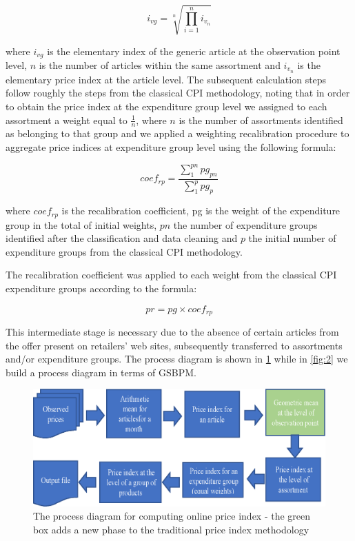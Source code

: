 \documentclass[]{article}
\begin{document}
\begin{equation}\label{eq:1}
i_{vg} = \sqrt[n]{\prod_{i=1}^{n} i_{v_{n}}}
\end{equation}


where $i_{vg}$ is the elementary index of the generic article at the observation point level, $n$ is the number of 
articles within the same assortment and $i_{v_{n}}$ is the elementary price index at the article level. 
The subsequent calculation steps follow roughly the steps from the classical CPI methodology, noting that in order 
to obtain the price index at the expenditure group level we assigned to each assortment a weight equal to $\frac{1}{n}$,
where $n$ is the number of assortments identified as belonging to that group and we applied a weighting 
recalibration procedure to aggregate price indices at expenditure group level using the following formula:


\begin{equation}\label{eq:2}
coef_{rp} = \frac{\sum_1^{pn}{pg_{pn}}}{\sum_1^p{pg_{p}}}
\end{equation}


where $coef_{rp}$  is the recalibration coefficient, pg is the weight of the expenditure group in the total of 
initial weights, $pn$ the number of expenditure groups identified after the classification and data cleaning 
and $p$ the initial number of expenditure groups from the classical CPI methodology.


The recalibration coefficient was applied to each weight from the classical CPI expenditure groups according to the formula:


\begin{equation}\label{eq:3}
pr = pg \times coef_{rp}
\end{equation}


This intermediate stage is necessary due to the absence of certain articles from the offer present on retailers' web sites, subsequently transferred to assortments and/or expenditure groups.
The process diagram is shown in \ref{fig:1} while in \ref{fig:2} we build a process diagram in terms of GSBPM.


\begin{figure}
\centering
\includegraphics[width=0.7\linewidth]{fig1.eps}
\caption{The process diagram for computing online price index - the green box adds a new phase to the traditional price index methodology}
\label{fig:1}
\end{figure}
\end{document}
